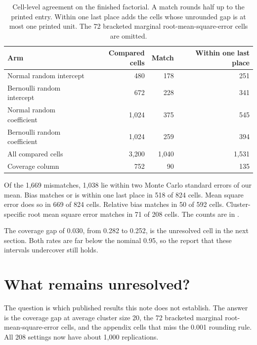 \begin{table}[H]
\centering
\footnotesize
\setlength{\tabcolsep}{4pt}
\renewcommand{\arraystretch}{1.2}
\caption{Cell-level agreement on the finished factorial.
A match rounds half up to the printed entry.
Within one last place adds the cells whose unrounded gap is at most one
printed unit.
The 72 bracketed marginal root-mean-square-error cells are omitted.}
\label{tab:grid}
\begin{tabular}{@{}lrrr@{}}
\toprule
Arm & Compared cells & Match & Within one last place \\
\midrule
Normal random intercept & 480 & 178 & 251 \\
Bernoulli random intercept & 672 & 228 & 341 \\
Normal random coefficient & 1,024 & 375 & 545 \\
Bernoulli random coefficient & 1,024 & 259 & 394 \\
All compared cells & 3,200 & 1,040 & 1,531 \\
Coverage column & 752 & 90 & 135 \\
\bottomrule
\end{tabular}
\end{table}

Of the 1,669 mismatches, 1,038 lie within two Monte Carlo standard errors of
our mean.
Bias matches or is within one last place in 518 of 824 cells.
Mean square error does so in 669 of 824 cells.
Relative bias matches in 50 of 592 cells.
Cluster-specific root mean square error matches in 71 of 208 cells.
The counts are in .

The coverage gap of 0.030, from 0.282 to 0.252, is the unresolved cell in the
next section.
Both rates are far below the nominal 0.95, so the report that these intervals
undercover still holds.

\section{What remains unresolved?}

The question is which published results this note does not establish.
The answer is the coverage gap at average cluster size 20, the 72 bracketed
marginal root-mean-square-error cells, and the appendix cells that miss the
0.001 rounding rule.
All 208 settings now have about 1,000 replications.

